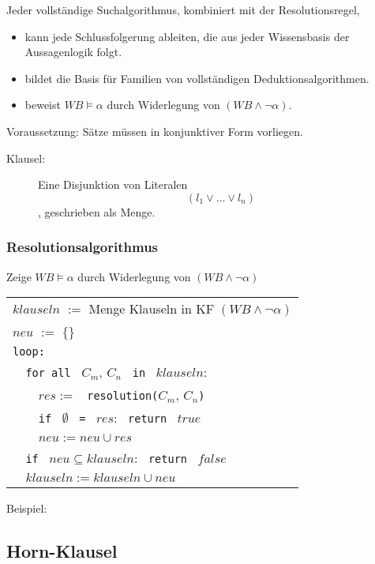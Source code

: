 Jeder vollständige Suchalgorithmus, kombiniert mit der Resolutionsregel,
\begin{itemize}
\item kann jede Schlussfolgerung ableiten, die aus jeder Wissensbasis der Aussagenlogik folgt.
\item bildet die Basis für Familien von vollständigen Deduktionsalgorithmen.
\item beweist $WB \models \alpha$ durch Widerlegung von $(WB \wedge \neg \alpha)$.
\end{itemize}
Voraussetzung: Sätze müssen in konjunktiver Form vorliegen.
\begin{description}
\item[Klausel:] Eine Disjunktion von Literalen $$(l_1 \vee \dots \vee l_n)$$, geschrieben als Menge.
\end{description}

\subsubsection{Resolutionsalgorithmus}

Zeige $WB \models \alpha$ durch Widerlegung von $(WB \wedge \neg \alpha)$
\begin{center}
\begin{tabular}{l}
$klauseln$ $:=$ Menge Klauseln in KF $(WB \wedge \neg \alpha)$ \\
$neu$ $:=$ $\{\}$ \\
\verb|loop:| \\
\verb|  for all | $C_m$, $C_n$ \verb| in | $klauseln$: \\
\verb|    |$res :=$ \verb| resolution(|$C_m$, $C_n$\verb|)| \\
\verb|    if | $\emptyset$ \verb| = | $res$: \verb| return | $true$ \\
\verb|    |$neu := neu \cup res$ \\
\verb|  if | $neu \subseteq klauseln$: \verb| return | $false$ \\
\verb|  |$klauseln := klauseln \cup neu$
\end{tabular}
\end{center}

Beispiel:

\subsection{Horn-Klausel}


